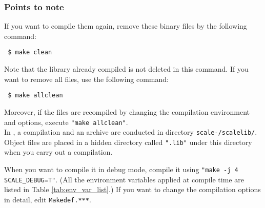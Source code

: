 \subsubsection{Points to note}

\noindent If you want to compile them again, remove these binary files by the following command:
\begin{verbatim}
 $ make clean
\end{verbatim}
Note that the library already compiled is not deleted in this command. If you want to remove all files, use the following command:
\begin{verbatim}
 $ make allclean
\end{verbatim}
Moreover, if the files are recompiled by changing the compilation environment and options,
execute \verb|"make allclean"|.\\


In \scalelib, a compilation and an archive are conducted in directory \texttt{scale-{\version}/scalelib/}.
Object files are placed in a hidden directory called \verb|".lib"| under this directory when you carry out a compilation.

When you want to compile it in debug mode, compile it using \verb|"make -j 4 SCALE_DEBUG=T"|.
(All the environment variables applied at compile time are listed in Table \ref{tab:env_var_list}.)
If you want to change the compilation options in detail, edit \verb|Makedef.***|.

